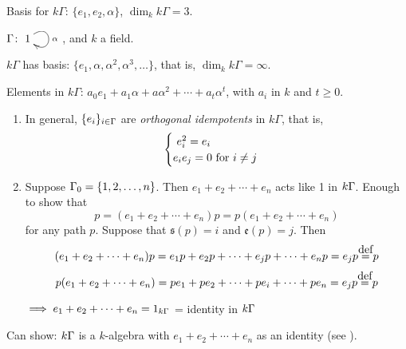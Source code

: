 Basis for $k\Gamma$: $\{ e_1, e_2, \alpha\}$, $\dim_kk\Gamma = 3$.

\begin{exam}
$\Gamma\colon \xymatrix{1\ar@(ur,dr)[]^\alpha}$, and $k$ a field.

$k\Gamma$ has basis: $\{e_1, \alpha, \alpha^2, \alpha^3, \ldots\}$,
that is, $\dim_k k\Gamma = \infty$. 

Elements in $k\Gamma$: $a_0e_1 + a_1\alpha + a\alpha^2 + \cdots +
a_t\alpha^t$, with $a_i$ in $k$ and $t\geqslant 0$.  
\end{exam}

\begin{note}
\begin{enumerate}
\item In general, $\{e_i\}_{i \in \Gamma}$ are \emph{orthogonal
    idempotents} in $k\Gamma$, that is, 
	\[ \begin{cases}\text{\ $e_i^2 = e_i$}\notag\\
	\text{$e_ie_j = 0$ for $i\neq j$}\notag
	\end{cases}\]
	
    \item Suppose $\Gamma_0 = \{1,2,\ldots,n\}$. Then $e_1 + e_2 + \cdots + e_n$
      acts like 1 in $k\Gamma$. Enough to show that
      \[p = (e_1 + e_2 + \cdots + e_n)p = p(e_1 + e_2 + \cdots +
        e_n)\] 
      for any path $p$. Suppose that $\mathfrak{s}(p) = i$ and
      $\mathfrak{e}(p) = j$. Then 
      \[(e_1 + e_2 + \cdots + e_n)p = e_1p + e_2p + \cdots + e_jp + \cdots +
      e_np = e_jp \defeq p\]
      \[p(e_1 + e_2 + \cdots + e_n) = pe_1 + pe_2 + \cdots + pe_i + \cdots +
      pe_n = e_jp \defeq p\]
	
    $\implies e_1 + e_2 + \cdots + e_n = 1_{k\Gamma}$ = identity in $k\Gamma$
\end{enumerate}
Can show: $k\Gamma$ is a $k$-algebra with $e_1 + e_2 + \cdots + e_n$ as an
identity (see \cite[page 50]{ARS}). 
\end{note}


